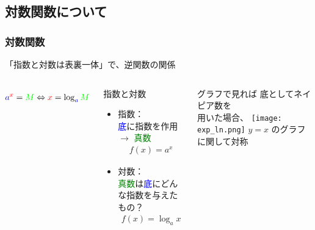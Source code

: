 \documentclass[12pt, dvipdfmx]{beamer}
\begin{document}
\subsection{対数関数について}
\begin{frame}
	\frametitle{対数関数}
		「指数と対数は表裏一体」で、逆関数の関係
			\begin{columns}[T, onlytextwidth]
					\begin{align*}
						\textcolor{blue}{a}^{\textcolor{red}{x}} = \textcolor{green}{M} \Leftrightarrow \textcolor{red}{x}= \log_{\textcolor{blue}{a}} \textcolor{green}{M}
					\end{align*}
					\vspace{-8mm}
					\begin{exampleblock}{指数と対数}
						\begin{itemize}
							\item 指数：\\
							\textcolor{blue}{底}に\alert{指数}を作用 $\rightarrow$ \textcolor{green}{真数}
								\vspace{-3mm}
								\begin{align*}
									f(x) = a^x
								\end{align*}
							\item 対数：\\
							\textcolor{green}{真数}は\textcolor{blue}{底}にどんな\alert{指数}を与えたもの？
							\vspace{-3mm}
								\begin{align*}
									f(x) = \log_a x
								\end{align*}
						\end{itemize}
					\end{exampleblock}
				\begin{block}{グラフで見れば}
					底としてネイピア数を\\用いた場合、
					\texttt{[image: exp\_ln.png]}
					$y=x$ のグラフに関して対称
				\end{block}
			\end{columns}
\end{frame}
\end{document}
